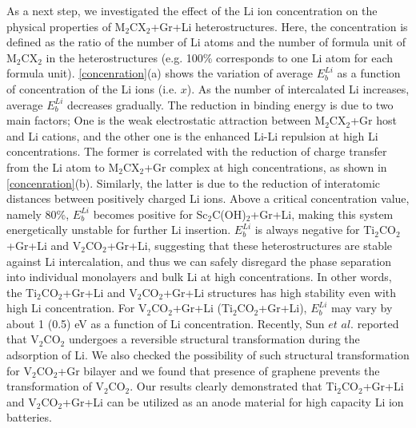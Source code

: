 As a next step, we investigated the effect of the Li ion concentration on the physical properties of M$_2$CX$_2$+Gr+Li heterostructures. Here, the concentration is defined as the ratio of the number of Li atoms and the number of formula unit of M$_2$CX$_2$ in the heterostructures (e.g. 100\% corresponds to one Li atom for each formula unit). \autoref{concenration}(a) shows the variation of average $E_{b}^{Li}$ as a function of concentration of the Li ions (i.e. $x$). As the number of intercalated Li increases,  average $E_{b}^{Li}$ decreases gradually. The reduction in binding energy is due to two main factors; One is the weak electrostatic attraction between M$_2$CX$_2$+Gr host and Li cations, and the other one is the enhanced Li-Li repulsion at high Li concentrations. The former is correlated with the reduction of charge transfer from the Li atom to M$_2$CX$_2$+Gr complex at high concentrations, as shown in \autoref{concenration}(b). Similarly, the latter is due to the reduction of interatomic distances between positively charged Li ions. Above a critical concentration value, namely 80\%,  $E_{b}^{Li}$ becomes positive for Sc$_2$C(OH)$_2$+Gr+Li, making this system energetically unstable for further Li insertion.  $E_{b}^{Li}$ is always negative for Ti$_2$CO$_2$+Gr+Li and V$_2$CO$_2$+Gr+Li, suggesting that these heterostructures are stable against Li intercalation, and thus we can safely disregard the phase separation into individual monolayers and bulk Li at high concentrations. In other words, the Ti$_2$CO$_2$+Gr+Li and V$_2$CO$_2$+Gr+Li structures has high stability even with high Li concentration. For V$_2$CO$_2$+Gr+Li (Ti$_2$CO$_2$+Gr+Li), $E_{b}^{Li}$ may vary by about 1 (0.5) eV as a function of Li concentration. Recently, Sun $et$ $al.$ \citet{doi:10.1021/acsami.5b03863}reported that V$_2$CO$_2$ undergoes a reversible structural transformation during the adsorption of Li. We also checked the possibility of such structural transformation for V$_2$CO$_2$+Gr bilayer and we found that presence of graphene prevents the transformation of V$_2$CO$_2$. Our results clearly demonstrated that Ti$_2$CO$_2$+Gr+Li and V$_2$CO$_2$+Gr+Li can be utilized as an anode material for high capacity Li ion batteries.

